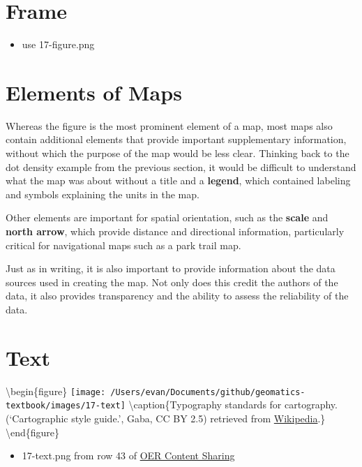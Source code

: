 \documentclass[
]{book}
\providecommand{\tightlist}{%
  \setlength{\itemsep}{0pt}\setlength{\parskip}{0pt}}
\begin{document}
\hypertarget{frame}{%
\section{Frame}\label{frame}}

\begin{itemize}
\tightlist
\item
  use 17-figure.png
\end{itemize}

\hypertarget{elements-of-maps}{%
\section{Elements of Maps}\label{elements-of-maps}}

Whereas the figure is the most prominent element of a map, most maps also contain additional elements that provide important supplementary information, without which the purpose of the map would be less clear. Thinking back to the dot density example from the previous section, it would be difficult to understand what the map was about without a title and a \textbf{legend}, which contained labeling and symbols explaining the units in the map.

Other elements are important for spatial orientation, such as the \textbf{scale} and \textbf{north arrow}, which provide distance and directional information, particularly critical for navigational maps such as a park trail map.

Just as in writing, it is also important to provide information about the data sources used in creating the map. Not only does this credit the authors of the data, it also provides transparency and the ability to assess the reliability of the data.

\hypertarget{text}{%
\section{Text}\label{text}}

\textbackslash begin\{figure\}
\texttt{[image: /Users/evan/Documents/github/geomatics-textbook/images/17-text]} \textbackslash caption\{Typography standards for cartography.(`Cartographic style guide.', \citet{Eric} Gaba, CC BY 2.5) retrieved from \href{https://en.wikipedia.org/wiki/Typography_(cartography)\#/media/File:Maps_template-en.svg}{Wikipedia}.\}\label{fig:17-text}
\textbackslash end\{figure\}

\begin{itemize}
\tightlist
\item
  17-text.png from row 43 of \href{https://docs.google.com/spreadsheets/d/1LqzXn00wMeIjHWstNT3tMImNDZirLGc3g72jFOQc_8I/edit\#gid=817407192}{OER Content Sharing}
\end{itemize}
\end{document}
